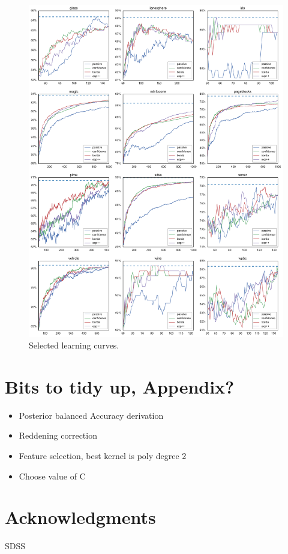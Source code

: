 \documentclass[fleqn,10pt,lineno]{wlpeerj} %
\begin{document}
\begin{figure}[tbp]
	\centering
	\includegraphics[width=\textwidth]{figures/learning_curves}
	\caption[Selected learning curves]{Selected learning curves.}
	\label{fig:learning_curves}
\end{figure}


\section*{Bits to tidy up, Appendix?}
\begin{itemize}
  \item Posterior balanced Accuracy derivation
  \item Reddening correction
  \item Feature selection, best kernel is poly degree 2
  \item Choose value of C
\end{itemize}


\section*{Acknowledgments}

SDSS


\end{document}
